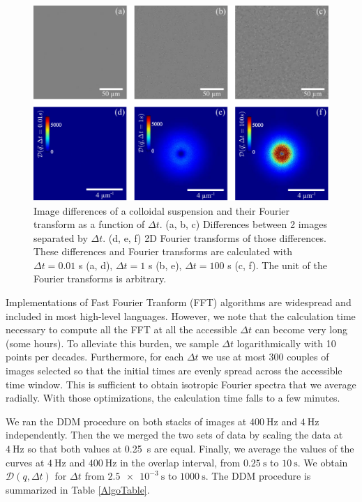 \documentclass[%
 aip,
 jmp,%
 amsmath,amssymb,
reprint,%
]{revtex4-1}
\begin{document}
\begin{figure}
\includegraphics[width=\linewidth]{Diff_TF.pdf}
\caption{Image differences of a colloidal suspension and their Fourier transform as a function of $\Delta t$. (a, b, c) Differences between 2 images separated by $\Delta t$. (d, e, f) 2D Fourier transforms of those differences. These differences and Fourier transforms are calculated with $\Delta t = 0.01$ s (a, d), $\Delta t = 1$ s (b, e), $\Delta t = 100$ s (c, f). The unit of the Fourier transforms is arbitrary.}
\label{DifferenceAndFFT}
\end{figure}

Implementations of Fast Fourier Tranform (FFT) algorithms are widespread and included in most high-level languages. However, we note that the calculation time necessary to compute all the FFT at all the accessible $\Delta t$ can become very long (some hours). To alleviate this burden, we sample $\Delta t$ logarithmically with 10 points per decades. Furthermore, for each $\Delta t$ we use at most 300 couples of images selected so that the initial times are evenly spread across the accessible time window. This is sufficient to obtain isotropic Fourier spectra that we average radially. With those optimizations, the calculation time falls to a few minutes.

We ran the DDM procedure on both stacks of images at $\SI{400}{\hertz}$ and $\SI{4}{\hertz}$ independently. Then the we merged the two sets of data by scaling the data at $\SI{4}{\hertz}$ so that both values at \SI{0.25}{\second} are equal. Finally, we average the values of the curves at $\SI{4}{\hertz}$ and $\SI{400}{\hertz}$ in the overlap interval, from $\SI{0.25}{\second}$ to $\SI{10}{\second}$. We obtain $\mathcal{D} (q, \Delta t)$ for $\Delta t$ from $\SI{2.5e-3}{\second}$ to $\SI{1000}{\second}$. The DDM procedure is summarized in Table \ref{AlgoTable}.
\end{document}
